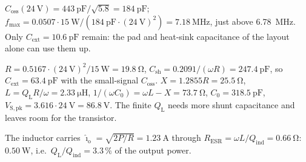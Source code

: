 
\begin{solutionblock}
	$C_\mathrm{oss}(\SI{24}{\volt})=\SI{443}{\pico\farad}/\sqrt{5.8}=\SI{184}{\pico\farad}$; $f_\mathrm{max}=0.0507\cdot\SI{15}{\watt}/(\SI{184}{\pico\farad}\cdot(\SI{24}{\volt})^2)=\SI{7.18}{\mega\hertz}$, just above \SI{6.78}{\mega\hertz}. Only $C_\mathrm{ext}=\SI{10.6}{\pico\farad}$ remain: the pad and heat-sink capacitance of the layout alone can use them up.
\end{solutionblock}


\begin{solutionblock}
	$R=0.5167\cdot(\SI{24}{\volt})^2/\SI{15}{\watt}=\SI{19.8}{\ohm}$, $C_\mathrm{sh}=0.2091/(\omega R)=\SI{247.4}{\pico\farad}$, so $C_\mathrm{ext}=\SI{63.4}{\pico\farad}$ with the small-signal $C_\mathrm{oss}$. $X=1.2855R=\SI{25.5}{\ohm}$, $L=Q_\mathrm{L}R/\omega=\SI{2.33}{\micro\henry}$, $1/(\omega C_0)=\omega L-X=\SI{73.7}{\ohm}$, $C_0=\SI{318.5}{\pico\farad}$, $V_\mathrm{S,pk}=3.616\cdot\SI{24}{\volt}=\SI{86.8}{\volt}$. The finite $Q_\mathrm{L}$ needs more shunt capacitance and leaves room for the transistor.

	The inductor carries $\hat{\imath}_\mathrm{o}=\sqrt{2P/R}=\SI{1.23}{\ampere}$ through $R_\mathrm{ESR}=\omega L/Q_\mathrm{ind}=\SI{0.66}{\ohm}$: $\SI{0.50}{\watt}$, i.e.\ $Q_\mathrm{L}/Q_\mathrm{ind}=3.3\,\%$ of the output power.
\end{solutionblock}


